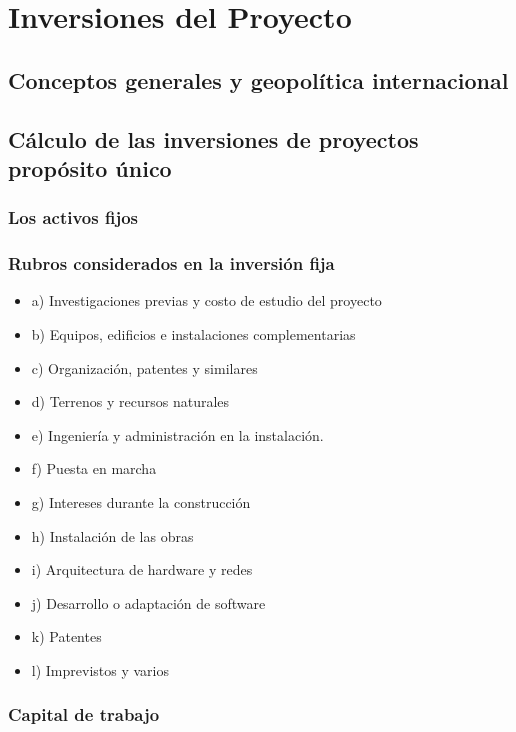 \documentclass[crop=false]{standalone}
\begin{document}
\section{Inversiones del Proyecto}

\subsection{Conceptos generales y geopolítica internacional}

\subsection{Cálculo de las inversiones de proyectos propósito único}

\subsubsection{Los activos fijos }
\subsubsection{Rubros considerados en la inversión fija}

\begin{itemize}
    \item a) Investigaciones previas y costo de estudio del proyecto
\item b) Equipos, edificios e instalaciones complementarias
\item c) Organización, patentes y similares
\item d) Terrenos y recursos naturales
\item e) Ingeniería y administración en la instalación.
\item f) Puesta en marcha
\item g) Intereses durante la construcción
\item h) Instalación de las obras
\item i) Arquitectura de hardware y redes
\item j) Desarrollo o adaptación de software
\item k) Patentes
\item l) Imprevistos y varios



    
\end{itemize}

\subsubsection{Capital de trabajo}
\end{document}

